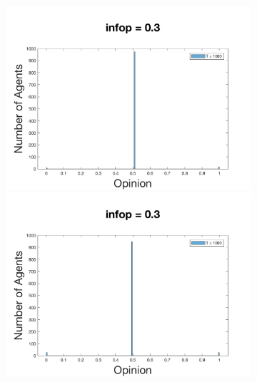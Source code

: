 \documentclass[11pt]{article}
\begin{document}
\begin{figure}[!htb]
\begin{subfigure}[t]{\textwidth}
\endminipage
\end{subfigure}


\begin{subfigure}[!htb]{\textwidth}
  \includegraphics[width=\linewidth]{p_5/gen_plot_201712171365491110e+01.png}
\endminipage\hfill
{}
  \includegraphics[width=\linewidth]{p_10/gen_plot_2017121712593647221e+01.png}
\endminipage\hfill
{}

\end{subfigure}
\end{figure}
\end{document}
